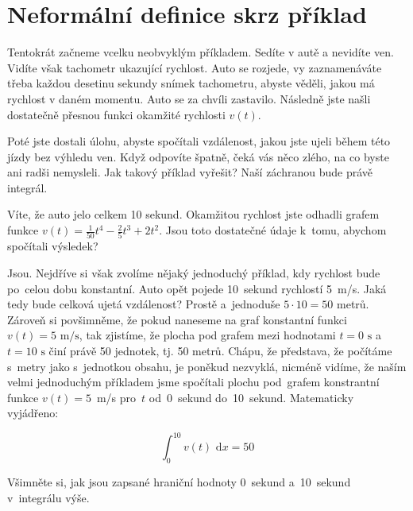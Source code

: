 \vfill{}
\pagebreak
\section{Neformální definice skrz příklad}

Tentokrát začneme vcelku neobvyklým příkladem. Sedíte v autě a nevidíte ven. Vidíte však tachometr ukazující rychlost. Auto se rozjede, vy zaznamenáváte třeba každou desetinu sekundy snímek tachometru, abyste věděli, jakou má rychlost v daném momentu. Auto se za chvíli zastavilo. Následně jste našli dostatečně přesnou funkci okamžité rychlosti $v(t)$.

Poté jste dostali úlohu, abyste spočítali vzdálenost, jakou jste ujeli během této jízdy bez výhledu ven. Když odpovíte špatně, čeká vás něco zlého, na co byste ani radši nemysleli. Jak takový příklad vyřešit? Naší záchranou bude právě integrál.

Víte, že auto jelo celkem 10 sekund. Okamžitou rychlost jste odhadli grafem funkce $v(t) = \frac{1}{50}t^4 - \frac{2}{5}t^3 + 2t^2$.
Jsou toto dostatečné údaje k~tomu, abychom spočítali výsledek?

Jsou. Nejdříve si však zvolíme nějaký jednoduchý příklad, kdy rychlost bude po~celou dobu konstantní. Auto opět pojede 10~sekund rychlostí 5~m/s. Jaká tedy bude celková ujetá vzdálenost? Prostě a~jednoduše $5 \cdot 10 = 50$ metrů. Zároveň si povšimněme, že pokud naneseme na graf konstantní funkci $v(t) = 5 \text{ m/s}$, tak zjistíme, že plocha pod grafem mezi hodnotami $t = 0\text{ s}$ a~$t = 10\text{ s}$ činí právě 50 jednotek, tj. 50 metrů. Chápu, že představa, že počítáme s~metry jako s~jednotkou obsahu, je poněkud nezvyklá, nicméně vidíme, že naším velmi jednoduchým příkladem jsme spočítali plochu pod~grafem konstrantní funkce $v(t) = 5$~m/s pro~$t$ od~0~sekund do~10~sekund. Matematicky vyjádřeno:

\begin{equation*}
\int_{0}^{10} v(t) \text{ d}x = 50
\end{equation*}

Všimněte si, jak jsou zapsané hraniční hodnoty 0~sekund a~10~sekund v~integrálu výše.
